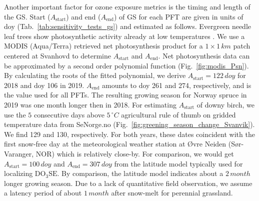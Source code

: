 \documentclass[bg, manuscript]{copernicus}
\begin{document}
Another important factor for ozone exposure metrics is the timing and length of the GS. Start ($A_\text{start}$) and end ($A_\text{end}$) of GS for each PFT are given in units of \unit{doy} (Tab.~\ref{tab:sensitivity_tests_gs}) and estimated as follows. Evergreen needle leaf trees show photosynthetic activity already at low temperatures \citep{TP:Wallin2013, TB:Kolari2007}. We use a MODIS (Aqua/Terra) retrieved net photosynthesis product for a $1\times 1\,\unit{km}$ patch centered at Svanhovd to determine $A_\text{start}$ and $A_\text{end}$. Net photosynthesis data can be approximated by a second order polynomial function (Fig.~\ref{fig:modis_Psn}). By calculating the roots of the fitted polynomial, we derive $A_\text{start} = 122\,\unit{doy}$ for 2018 and \unit{doy} 106 in 2019. $A_\text{end}$ amounts to \unit{doy} 261 and 274, respectively, and is the value used for all PFTs. The resulting growing season for Norway spruce in 2019 was one month longer then in 2018. For estimating $A_\text{start}$ of downy birch, we use the $5$ consecutive days above $5\,\unit{^\circ C}$ agricultural rule of thumb on gridded temperature data from SeNorge.no (Fig.~\ref{fig:greening_season_change_Svanvik}). We find 129 and 130, respectively. For both years, these dates coincident with the first snow-free day at the meteorological weather station at Øvre Neiden (Sør-Varanger, NOR) which is relatively close-by.
For comparison, we would get $A_\mathrm{start} = 100\,\unit{doy}$ and $A_\mathrm{end} = 307\,\unit{doy}$ from the latitude model typically used for localizing $\mathrm{DO_3SE}$. By comparison, the latitude model indicates about a $2\,\unit{month}$ longer growing season. Due to a lack of quantitative field observation, we assume a latency period of about $1\,\unit{month}$ after snow-melt for perennial grassland. 
\end{document}
